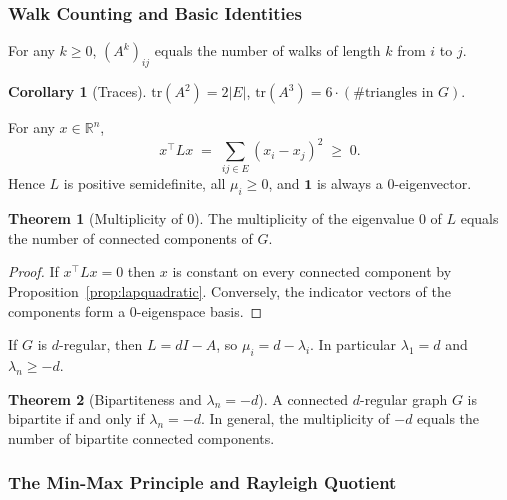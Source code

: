 \documentclass{article}
\theoremstyle{definition}
\newtheorem{theorem}{Theorem}
\newtheorem{corollary}{Corollary}
\begin{document}
\subsubsection{Walk Counting and Basic Identities}

\begin{proposition}\label{prop:walkcount}
For any $k \ge 0$, $(A^k)_{ij}$ equals the number of walks of length
$k$ from $i$ to $j$.
\end{proposition}

\begin{corollary}[Traces]
$\mathrm{tr}(A^2) = 2|E|$, $\mathrm{tr}(A^3) = 6 \cdot (\# \text{triangles in } G)$.
\end{corollary}

\begin{proposition}\label{prop:lapquadratic}
For any $x \in \mathbb R^n$,
\[
  x^\top L x \;=\; \sum_{ij \in E} (x_i - x_j)^2 \;\ge\; 0.
\]
Hence $L$ is positive semidefinite, all $\mu_i \ge 0$, and
$\mathbf 1$ is always a $0$-eigenvector.
\end{proposition}

\begin{theorem}[Multiplicity of $0$]\label{thm:laplacian-components}
The multiplicity of the eigenvalue $0$ of $L$ equals the number of
connected components of $G$.
\end{theorem}

\begin{proof}
If $x^\top L x = 0$ then $x$ is constant on every connected component
by Proposition~\ref{prop:lapquadratic}. Conversely, the indicator
vectors of the components form a $0$-eigenspace basis.
\end{proof}

\begin{proposition}
If $G$ is $d$-regular, then $L = dI - A$, so $\mu_i = d - \lambda_i$.
In particular $\lambda_1 = d$ and $\lambda_n \ge -d$.
\end{proposition}

\begin{theorem}[Bipartiteness and $\lambda_n = -d$]
A connected $d$-regular graph $G$ is bipartite if and only if $\lambda_n = -d$.
In general, the multiplicity of $-d$ equals the number of bipartite connected
components.
\end{theorem}

\subsubsection{The Min-Max Principle and Rayleigh Quotient}
\end{document}
